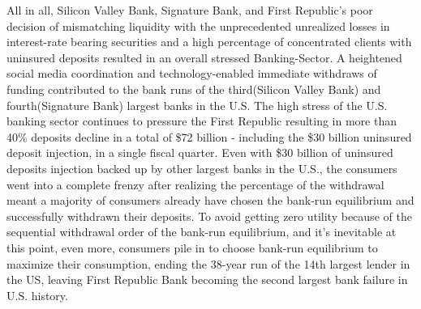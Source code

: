 \documentclass[a4paper]{article}
\begin{document}
All in all, Silicon Valley Bank, Signature Bank, and First Republic's poor decision of mismatching liquidity with the unprecedented unrealized losses in interest-rate bearing securities and a high percentage of concentrated clients with uninsured deposits resulted in an overall stressed Banking-Sector. A heightened social media coordination and technology-enabled immediate withdraws of funding contributed to the bank runs of the third(Silicon Valley Bank) and fourth(Signature Bank) largest banks in the U.S. The high stress of the U.S. banking sector continues to pressure the First Republic resulting in more than 40\% deposits decline in a total of \$72 billion - including the \$30 billion uninsured deposit injection, in a single fiscal quarter. Even with \$30 billion of uninsured deposits injection backed up by other largest banks in the U.S., the consumers went into a complete frenzy after realizing the percentage of the withdrawal meant a majority of consumers already have chosen the bank-run equilibrium and successfully withdrawn their deposits. To avoid getting zero utility because of the sequential withdrawal order of the bank-run equilibrium, and it's inevitable at this point, even more, consumers pile in to choose bank-run equilibrium to maximize their consumption, ending the 38-year run of the 14th largest lender in the US, leaving First Republic Bank becoming the second largest bank failure in U.S. history. 

\newpage

\end{document}
